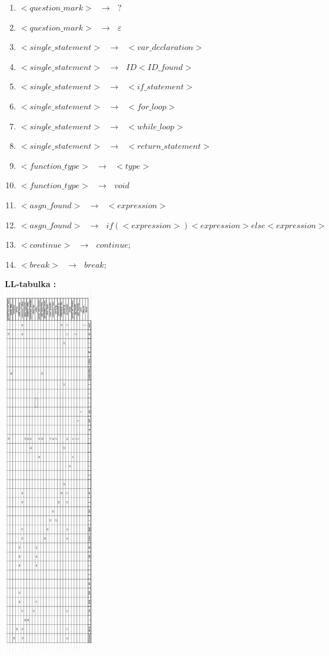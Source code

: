 \documentclass[12pt]{article}
\begin{document}
\begin{enumerate}
\item $<question\_mark> \text{ }\to \text{ } ?$
\item $<question\_mark> \text{ }\to \text{ } \varepsilon$
\item $ <single\_statement> \text{ }\to \text{ } <var\_declaration>$
\item $ <single\_statement> \text{ }\to \text{ } ID <ID\_found>$
\item $ <single\_statement> \text{ }\to \text{ } <if\_statement>$
\item $ <single\_statement> \text{ }\to \text{ } <for\_loop>$
\item $<single\_statement> \text{ }\to \text{ } <while\_loop>$
\item $<single\_statement> \text{ }\to \text{ } <return\_statement>$
\item $<function\_type> \text{ }\to \text{ } <type>$
\item $<function\_type> \text{ }\to \text{ } void$
\item $<asgn\_found> \text{ }\to \text{ } <expression> $
\item $<asgn\_found> \text{ }\to \text{ } if (<expression>) <expression> else <expression>$
\item $<continue> \text{ }\to \text{ } continue ;$
\item $<break> \text{ }\to \text{ } break ;$

\end{enumerate}


 \Large \textbf{LL-tabulka :}
\newline \\

\includegraphics[width=0.3\textwidth,scale=0.3]{LLtabulka}
\end{document}

